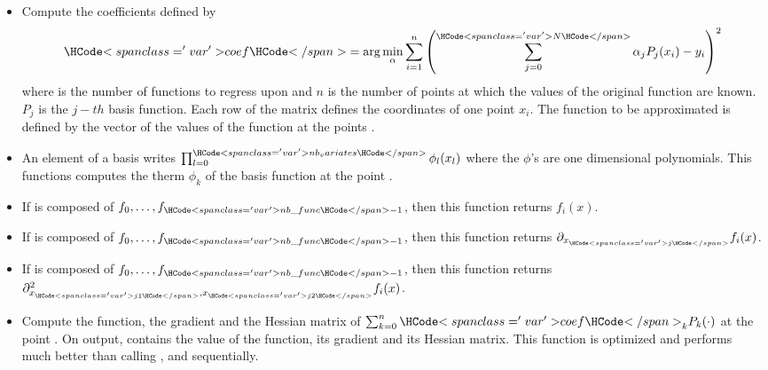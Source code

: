 \begin{itemize}
\item {}
  \sshortdescribe Compute the coefficients  defined by
  \begin{equation*}
    \var{coef} = \arg\min_\alpha \sum_{i=1}^n
    \left( \sum_{j=0}^{\var{N}} \alpha_j  P_j(x_i) - y_i\right)^2
  \end{equation*}
  where  is the number of functions to regress upon and $n$ is the number
  of points at which the values of the original function are known. $P_j$ is the
  $j-th$ basis function. Each row of the matrix  defines the coordinates
  of one point $x_i$. The function to be approximated is defined by the vector
   of the values of the function at the points .

\item {}
  \sshortdescribe An element of a basis writes $\prod_{l=0}^{\var{nb_variates}}
  \phi_l(x_l)$ where the $\phi$'s are one dimensional polynomials. This
  functions computes the therm $\phi_k$ of the  basis function at the
  point .
\item {}
  \sshortdescribe If  is composed of $f_0, \dots, f_{\var{nb\_func}-1}$,
  then this function returns $f_i(x)$. 

\item {}
  \sshortdescribe If  is composed of $f_0, \dots, f_{\var{nb\_func}-1}$,
  then this function returns $\partial_{x_{\var{j}}} f_i(x)$.

  
\item {}
  \sshortdescribe If  is composed of $f_0, \dots, f_{\var{nb\_func}-1}$,
  then this function returns $\partial^2_{x_{\var{j1}}, x_{\var{j2}}}
  f_i(x)$.


\item {}
  \sshortdescribe Compute the function, the gradient and the Hessian matrix
  of $\sum_{k=0}^n \var{coef}_k  P_k(\cdot)$ at the point .
  On output,  contains the value of the function,  its
  gradient and  its Hessian matrix. This function is optimized and
  performs much better than calling ,
   and  sequentially.


\end{itemize}
